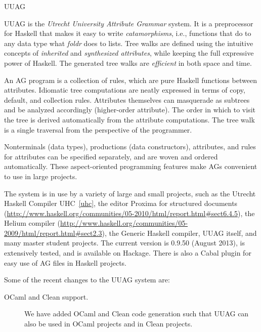 \begin{hcarentry}[updated]{UUAG}
\label{uuag}
\makeheader

UUAG is the \emph{Utrecht University Attribute Grammar} system. It is a preprocessor for Haskell
that makes it easy to write \emph{catamorphisms}, i.e., functions that do to any data type what
\emph{foldr} does to lists. Tree walks are defined using the intuitive concepts of
\emph{inherited} and \emph{synthesized attributes}, while keeping the full expressive power
of Haskell. The generated tree walks are \emph{efficient} in both space and time.

An AG program is a collection of rules, which are pure Haskell functions between attributes.
Idiomatic tree computations are neatly expressed in terms of copy, default, and collection rules.
Attributes themselves can masquerade as subtrees and be analyzed accordingly (higher-order attribute). The order in which to visit the tree is derived automatically from the attribute computations. The tree walk is a single traversal from the perspective of the programmer.

Nonterminals (data types), productions (data constructors), attributes, and rules for attributes can be specified separately, and are woven and ordered automatically. These aspect-oriented programming features make AGs convenient to use in large projects.

The system is in use by a variety of large and small projects, such as the Utrecht Haskell Compiler UHC~\cref{uhc}, the editor Proxima for structured documents (\url{http://www.haskell.org/communities/05-2010/html/report.html#sect6.4.5}), the Helium compiler (\url{http://www.haskell.org/communities/05-2009/html/report.html#sect2.3}), the Generic Haskell compiler, UUAG itself, and many master student projects.
The current version is 0.9.50 (August 2013), is extensively tested, and is available on Hackage. There is also a Cabal plugin for easy use of AG files in Haskell projects.

Some of the recent changes to the UUAG system are:
\begin{description}
\item[OCaml and Clean support.]
  We have added OCaml and Clean code generation such that UUAG can also be used in OCaml projects and in Clean projects.
\end{description}


\end{hcarentry}
